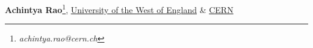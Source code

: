 \textbf{Achintya Rao}\footnote{\textit{achintya.rao@cern.ch}}, \href{http://uwe.ac.uk}{University of the West of England} \& \href{http://cern.ch}{CERN}\\
